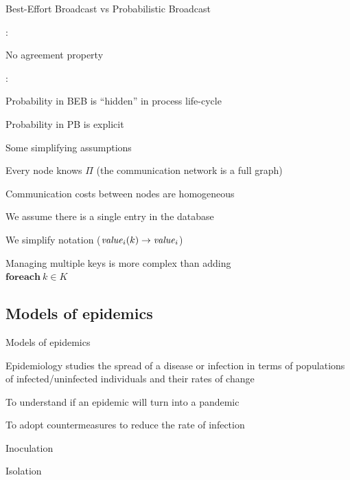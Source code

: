 \begin{frame}{Best-Effort Broadcast vs Probabilistic Broadcast}

:

\BI
\item No agreement property
\EI

:

\BI
\item Probability in BEB is “hidden” in process life-cycle
\item Probability in PB is explicit	
\EI
	
\end{frame}	

\begin{frame}{Some simplifying assumptions}

\BIL
\item Every node knows $\Pi$ (the communication network is a full graph)
\item Communication costs between nodes are homogeneous
\item We assume there is a single entry in the database
 \BI
  \item We simplify notation ($\mathit{value}_i(k) \rightarrow \mathit{value}_i$)
  \item Managing multiple keys is more complex than adding \\
   $\textbf{foreach}\ k \in K$
 \EI
\EIL

\bigskip
{}

\end{frame}

	
\subsection{Models of epidemics}
	
\begin{frame}{Models of epidemics}
	
\begin{definition}[Epidemiology]
\alert{Epidemiology} studies the spread of a disease or infection in terms of populations 
of infected/uninfected individuals and their rates of change
\end{definition}

\bigskip
{}
\BI
\item To understand if an epidemic will turn into a pandemic
\item To adopt countermeasures to reduce the rate of infection
 \BI
 \item Inoculation
 \item Isolation
 \EI
\EI

\end{frame}

